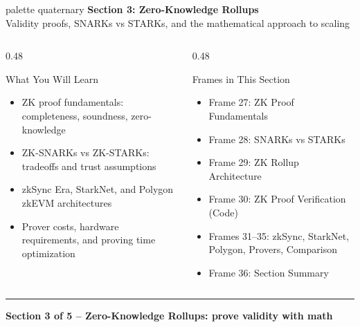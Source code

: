 \documentclass[8pt,aspectratio=169]{beamer}
\newcommand{\bottomnote}[1]{\vfill\vspace{-2mm}\textcolor{mllavender2}{\rule{\textwidth}{0.4pt}}\vspace{1mm}\footnotesize\textbf{#1}}
\begin{document}
\begin{frame}{}
\begin{beamercolorbox}[sep=12pt,center,rounded=true,shadow=true]{palette quaternary}
{\Large\bfseries Section 3: Zero-Knowledge Rollups}\\[6pt]
{\normalsize Validity proofs, SNARKs vs STARKs, and the mathematical approach to scaling}
\end{beamercolorbox}
\vspace{6mm}
\begin{columns}[T]
\begin{column}{0.48\textwidth}
\begin{block}{What You Will Learn}
\begin{itemize}\setlength\itemsep{3pt}
  \item[\small$\checkmark$] \small ZK proof fundamentals: completeness, soundness, zero-knowledge
  \item[\small$\checkmark$] \small ZK-SNARKs vs ZK-STARKs: tradeoffs and trust assumptions
  \item[\small$\checkmark$] \small zkSync Era, StarkNet, and Polygon zkEVM architectures
  \item[\small$\checkmark$] \small Prover costs, hardware requirements, and proving time optimization
\end{itemize}
\end{block}
\end{column}
\begin{column}{0.48\textwidth}
\begin{block}{Frames in This Section}
\begin{itemize}\setlength\itemsep{3pt}
  \item[\small$\bullet$] \small Frame 27: ZK Proof Fundamentals
  \item[\small$\bullet$] \small Frame 28: SNARKs vs STARKs
  \item[\small$\bullet$] \small Frame 29: ZK Rollup Architecture
  \item[\small$\bullet$] \small Frame 30: ZK Proof Verification (Code)
  \item[\small$\bullet$] \small Frames 31--35: zkSync, StarkNet, Polygon, Provers, Comparison
  \item[\small$\bullet$] \small Frame 36: Section Summary
\end{itemize}
\end{block}
\end{column}
\end{columns}
\bottomnote{Section 3 of 5 -- Zero-Knowledge Rollups: prove validity with math}
\end{frame}
\end{document}
